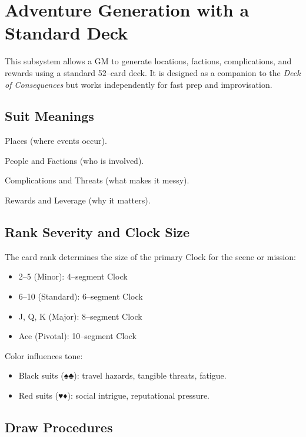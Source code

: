 \documentclass[12pt]{article}
\begin{document}
\section{Adventure Generation with a Standard Deck}

This subsystem allows a GM to generate locations, factions, complications, and rewards using a standard 52--card deck. It is designed as a companion to the \emph{Deck of Consequences} but works independently for fast prep and improvisation.

\subsection{Suit Meanings}
\begin{description}[leftmargin=2cm]
  \item[Spades:] Places (where events occur).
  \item[Hearts:] People and Factions (who is involved).
  \item[Clubs:] Complications and Threats (what makes it messy).
  \item[Diamonds:] Rewards and Leverage (why it matters).
\end{description}

\subsection{Rank Severity and Clock Size}
The card rank determines the size of the primary Clock for the scene or mission:
\begin{itemize}
  \item 2--5 (Minor): 4--segment Clock
  \item 6--10 (Standard): 6--segment Clock
  \item J, Q, K (Major): 8--segment Clock
  \item Ace (Pivotal): 10--segment Clock
\end{itemize}

Color influences tone:
\begin{itemize}
  \item Black suits (♠♣): travel hazards, tangible threats, fatigue.
  \item Red suits (♥♦): social intrigue, reputational pressure.
\end{itemize}

\subsection{Draw Procedures}
\end{document}
